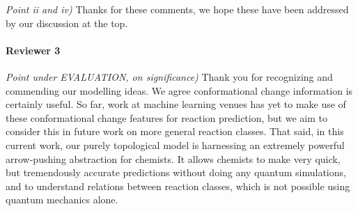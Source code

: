 \documentclass{article}
\begin{document}
 
\emph{Point ii and iv)} Thanks for these comments, we hope these have been addressed by our discussion at the top.



\paragraph{Reviewer 3}
\emph{Point under EVALUATION, on significance)}
Thank you for recognizing and commending our modelling ideas. We agree conformational change information is certainly useful. So far, work at machine learning venues has yet to make use of these conformational change features for reaction prediction, but we aim to consider this in future work on more general reaction classes. That said, in this current work, our purely topological model is harnessing an extremely powerful arrow-pushing abstraction for chemists. It allows chemists to make very quick, but tremendously accurate predictions without doing any quantum simulations, and to understand relations between reaction classes, which is not possible using quantum mechanics alone. 
\end{document}
